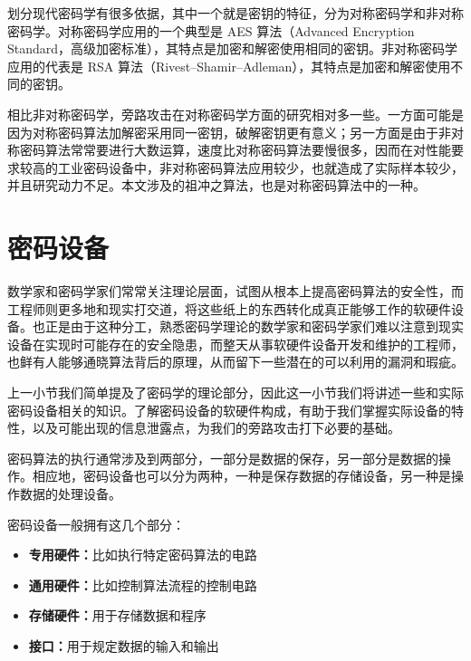 划分现代密码学有很多依据，其中一个就是密钥的特征，分为对称密码学和非对称密码学。对称密码学应用的一个典型是 AES 算法（Advanced Encryption Standard，高级加密标准），其特点是加密和解密使用相同的密钥。非对称密码学应用的代表是 RSA 算法（Rivest–Shamir–Adleman），其特点是加密和解密使用不同的密钥。

相比非对称密码学，旁路攻击在对称密码学方面的研究相对多一些。一方面可能是因为对称密码算法加解密采用同一密钥，破解密钥更有意义；另一方面是由于非对称密码算法常常要进行大数运算，速度比对称密码算法要慢很多，因而在对性能要求较高的工业密码设备中，非对称密码算法应用较少，也就造成了实际样本较少，并且研究动力不足。本文涉及的祖冲之算法，也是对称密码算法中的一种。




\section{密码设备} %
数学家和密码学家们常常关注理论层面，试图从根本上提高密码算法的安全性，而工程师则更多地和现实打交道，将这些纸上的东西转化成真正能够工作的软硬件设备。也正是由于这种分工，熟悉密码学理论的数学家和密码学家们难以注意到现实设备在实现时可能存在的安全隐患，而整天从事软硬件设备开发和维护的工程师，也鲜有人能够通晓算法背后的原理，从而留下一些潜在的可以利用的漏洞和瑕疵。

上一小节我们简单提及了密码学的理论部分，因此这一小节我们将讲述一些和实际密码设备相关的知识。了解密码设备的软硬件构成，有助于我们掌握实际设备的特性，以及可能出现的信息泄露点，为我们的旁路攻击打下必要的基础。

密码算法的执行通常涉及到两部分，一部分是数据的保存，另一部分是数据的操作。相应地，密码设备也可以分为两种，一种是保存数据的存储设备，另一种是操作数据的处理设备。

密码设备一般拥有这几个部分：

\begin{itemize}
\item \textbf{专用硬件：}比如执行特定密码算法的电路
\item \textbf{通用硬件：}比如控制算法流程的控制电路
\item \textbf{存储硬件：}用于存储数据和程序
\item \textbf{接口：}用于规定数据的输入和输出
\end{itemize}

